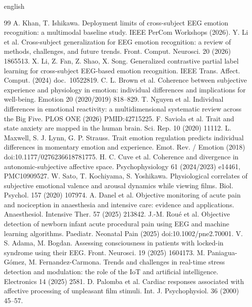 \documentclass[10pt]{article}
\begin{document}
\begin{otherlanguage*}{english}
\begin{thebibliography}{99}
 A. Khan, T. Ishikawa. Deployment limits of cross-subject EEG emotion recognition: a multimodal baseline study. IEEE PerCom Workshops (2026).
 Y. Li et al. Cross-subject generalization for EEG emotion recognition: a review of methods, challenges, and future trends. Front. Comput. Neurosci. 20 (2026) 1865513.
 X. Li, Z. Fan, Z. Shao, X. Song. Generalized contrastive partial label learning for cross-subject EEG-based emotion recognition. IEEE Trans. Affect. Comput. (2024) doc.\ 10522819.
 C. L. Brown et al. Coherence between subjective experience and physiology in emotion: individual differences and implications for well-being. Emotion 20 (2020/2019) 818--829.
 T. Nguyen et al. Individual differences in emotional reactivity: a multidimensional systematic review across the Big Five. PLOS ONE (2026) PMID:42715225.
 F. Saviola et al. Trait and state anxiety are mapped in the human brain. Sci. Rep. 10 (2020) 11112.
 L. Maxwell, S. J. Lynn, G. P. Strauss. Trait emotion regulation predicts individual differences in momentary emotion and experience. Emot. Rev. / Emotion (2018) doi:10.1177/0276236618781775.
 H. C. Cuve et al. Coherence and divergence in autonomic-subjective affective space. Psychophysiology 61 (2024/2023) e14461, PMC10909527.
 W. Sato, T. Kochiyama, S. Yoshikawa. Physiological correlates of subjective emotional valence and arousal dynamics while viewing films. Biol. Psychol. 157 (2020) 107974.
 A. Danel et al. Objective monitoring of acute pain and nociception in anaesthesia and intensive care: evidence and applications. Anaesthesiol. Intensive Ther. 57 (2025) 213842.
 J.-M. Roué et al. Objective detection of newborn infant acute procedural pain using EEG and machine learning algorithms. Paediatr. Neonatal Pain (2025) doi:10.1002/pne2.70001.
 V. S. Adama, M. Bogdan. Assessing consciousness in patients with locked-in syndrome using their EEG. Front. Neurosci. 19 (2025) 1604173.
 M. Paniagua-Gómez, M. Fernandez-Carmona. Trends and challenges in real-time stress detection and modulation: the role of the IoT and artificial intelligence. Electronics 14 (2025) 2581.
 D. Palomba et al. Cardiac responses associated with affective processing of unpleasant film stimuli. Int. J. Psychophysiol. 36 (2000) 45--57.

\end{thebibliography}
\end{otherlanguage*}
\end{document}
